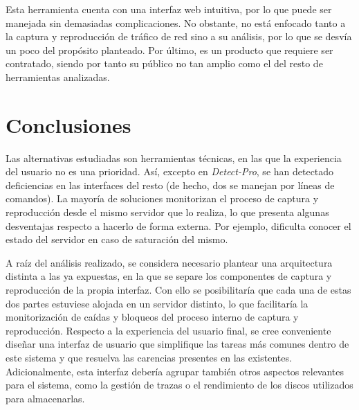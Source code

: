Esta herramienta cuenta con una interfaz web intuitiva, por lo que puede ser manejada sin demasiadas complicaciones.
No obstante, no está enfocado tanto a la captura y reproducción de tráfico de red sino a su análisis, por lo que se desvía un poco del propósito planteado.
Por último, es un producto que requiere ser contratado, siendo por tanto su público no tan amplio como el del resto de herramientas analizadas.

\section{Conclusiones\label{sec:eda:conclusiones}}

Las alternativas estudiadas son herramientas técnicas, en las que la experiencia del usuario no es una prioridad.
Así, excepto en \textit{Detect-Pro}, se han detectado deficiencias en las interfaces del resto (de hecho, dos se manejan por líneas de comandos).
La mayoría de soluciones monitorizan el proceso de captura y reproducción desde el mismo servidor que lo realiza, lo que presenta algunas desventajas respecto a hacerlo de forma externa.
Por ejemplo, dificulta conocer el estado del servidor en caso de saturación del mismo.

A raíz del análisis realizado, se considera necesario plantear una arquitectura distinta a las ya expuestas, en la que se separe los componentes de captura y reproducción de la propia interfaz.
Con ello se posibilitaría que cada una de estas dos partes estuviese alojada en un servidor distinto, lo que facilitaría la monitorización de caídas y bloqueos del proceso interno de captura y reproducción.
Respecto a la experiencia del usuario final, se cree conveniente diseñar una interfaz de usuario que simplifique las tareas más comunes dentro de este sistema y que resuelva las carencias presentes en las existentes.
Adicionalmente, esta interfaz debería agrupar también otros aspectos relevantes para el sistema, como la gestión de \glspl{traza} o el rendimiento de los discos utilizados para almacenarlas.
